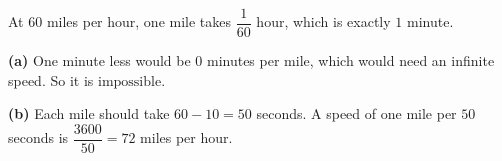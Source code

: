 At $60$ miles per hour, one mile takes $\dfrac1{60}$ hour, which is exactly $1$ minute.

\textbf{(a)} One minute less would be $0$ minutes per mile, which would need an infinite speed. So it is $\boxed{\text{impossible}}$.

\textbf{(b)} Each mile should take $60-10=50$ seconds. A speed of one mile per $50$ seconds is $\dfrac{3600}{50}=\boxed{72}$ miles per hour.
